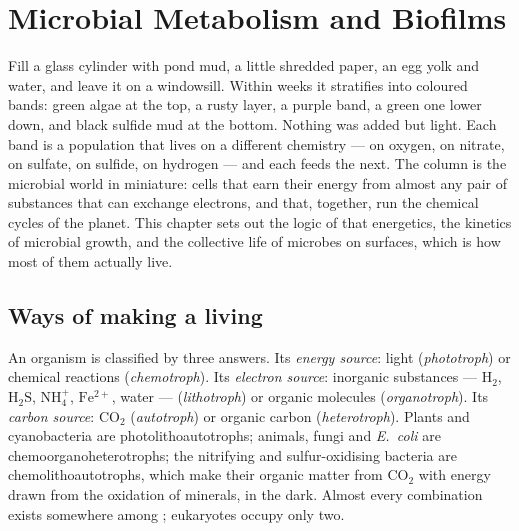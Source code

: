 \chapter{Microbial Metabolism and Biofilms}\label{ch:b2:microbial-metabolism}

Fill a glass cylinder with pond mud, a little shredded paper, an egg
yolk and water, and leave it on a windowsill. Within weeks it
stratifies into coloured bands: green algae at the top, a rusty
layer, a purple band, a green one lower down, and black sulfide mud
at the bottom. Nothing was added but light. Each band is a population
that lives on a different chemistry --- on oxygen, on nitrate, on
sulfate, on sulfide, on hydrogen --- and each feeds the next. The
column is the microbial world in miniature: cells that earn their
energy from almost any pair of substances that can exchange
electrons, and that, together, run the chemical cycles of the
planet. This chapter sets out the logic of that energetics, the
kinetics of microbial growth, and the collective life of microbes on
surfaces, which is how most of them actually live.

\section{Ways of making a living}

\begin{definition}\label{def:b2:microbial-metabolism:trophic}
An organism is classified by three answers. Its \emph{energy source}:
light (\emph{phototroph}) or chemical reactions (\emph{chemotroph}).
Its \emph{electron source}: inorganic substances --- $\mathrm{H_2}$,
$\mathrm{H_2S}$, $\mathrm{NH_4^+}$, $\mathrm{Fe^{2+}}$, water ---
(\emph{lithotroph}) or organic molecules (\emph{organotroph}). Its
\emph{carbon source}: $\mathrm{CO_2}$ (\emph{autotroph}) or organic
carbon (\emph{heterotroph}). Plants and cyanobacteria are
photolithoautotrophs; animals, fungi and \emph{E.~coli} are
chemoorganoheterotrophs; the nitrifying and sulfur-oxidising
bacteria are chemolithoautotrophs, which make their organic matter
from $\mathrm{CO_2}$ with energy drawn from the oxidation of
minerals, in the dark. Almost every combination exists somewhere
among ; eukaryotes occupy only two.
\end{definition}

